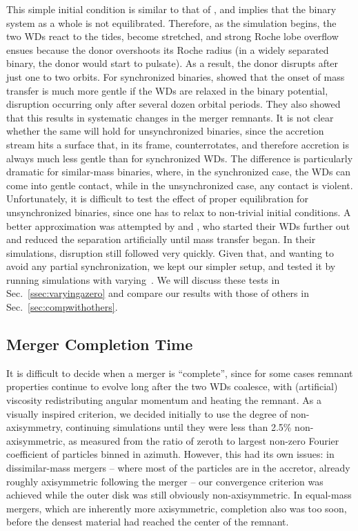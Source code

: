 This simple initial condition is similar to that of \cite{pakm+10}, and implies that the binary system as a whole is not equilibrated.  Therefore, as the simulation begins, the two WDs react to the tides, become stretched, and strong Roche lobe overflow ensues because the donor overshoots its Roche radius (in a widely separated binary, the donor would start to pulsate).  As a result, the donor disrupts after just one to two orbits.  For synchronized binaries, \cite{dan+11} showed that the onset of mass transfer is much more gentle if the WDs are relaxed in the binary potential, disruption occurring only after several dozen orbital periods.  They also showed that this results in systematic changes in the merger remnants.  It is not clear whether the same will hold for unsynchronized binaries, since the accretion stream hits a surface that, in its frame, counterrotates, and therefore accretion is always much less gentle than for synchronized WDs.  The difference is particularly dramatic for similar-mass binaries, where, in the synchronized case, the WDs can come into gentle contact, while in the unsynchronized case, any contact is violent.  Unfortunately, it is difficult to test the effect of proper equilibration for unsynchronized binaries, since one has to relax to non-trivial initial conditions.  A better approximation was attempted by \citeal{loreig09} and \cite{guerig04}, who started their WDs further out and reduced the separation artificially until mass transfer began.  In their simulations, disruption still followed very quickly.  Given that, and wanting to avoid any partial synchronization, we kept our simpler setup, and tested it by running simulations with varying~{\azero}.  We will discuss these tests in Sec.~\ref{ssec:varyingazero} and compare our results with those of others in Sec.~\ref{sec:compwithothers}.

\subsection{Merger Completion Time}
\label{ssec:mergercomplete}

It is difficult to decide when a merger is ``complete'', since for some cases remnant properties continue to evolve long after the two WDs coalesce, with (artificial) viscosity redistributing angular momentum and heating the remnant.  As a visually inspired criterion, we decided initially to use the degree of non-axisymmetry, continuing simulations until they were less than 2.5\% non-axisymmetric, as measured from the ratio of zeroth to largest non-zero Fourier coefficient of particles binned in azimuth.  However, this had its own issues: in dissimilar-mass mergers --  where most of the particles are in the accretor, already roughly axisymmetric following the merger -- our convergence criterion was achieved while the outer disk was still obviously non-axisymmetric.  In equal-mass mergers, which are inherently more axisymmetric, completion also was too soon, before the densest material had reached the center of the remnant.

